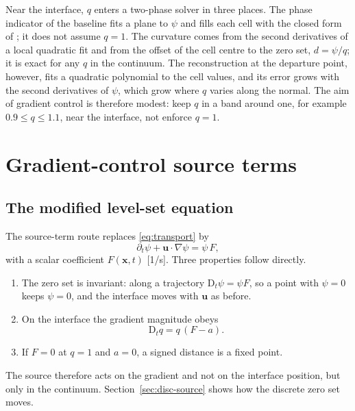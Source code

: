 \documentclass[preprint,3p,11pt]{elsarticle}
\newcommand{\psilev}{\psi}
\newcommand{\bu}{\mathbf{u}}
\newcommand{\bx}{\mathbf{x}}
\newcommand{\Dt}{\mathrm{D}_t}
\begin{document}
Near the interface, $q$ enters a two-phase solver in three places. The phase
indicator of the baseline fits a plane to $\psilev$ and fills each cell with the
closed form of \cite{DetrixheAslam2016}; it does not assume $q=1$. The curvature comes
from the second derivatives of a local quadratic fit and from the offset of the cell
centre to the zero set, $d=\psilev/q$; it is exact for any $q$ in the continuum. The
reconstruction at the departure point, however, fits a quadratic polynomial to the
cell values, and its error grows with the second derivatives of $\psilev$, which grow
where $q$ varies along the normal. The aim of gradient control is therefore modest:
keep $q$ in a band around one, for example $0.9\le q\le1.1$, near the interface, not
enforce $q=1$.

\section{Gradient-control source terms}
\label{sec:model}

\subsection{The modified level-set equation}
\label{sec:model-source}
The source-term route replaces \eqref{eq:transport} by
\begin{equation}
  \partial_t\psilev+\bu\cdot\nabla\psilev = \psilev\,F,
  \label{eq:sourceEq}
\end{equation}
with a scalar coefficient $F(\bx,t)$ [1/s]. Three properties follow directly.
\begin{enumerate}
  \item The zero set is invariant: along a trajectory $\Dt\psilev=\psilev F$, so a
  point with $\psilev=0$ keeps $\psilev=0$, and the interface moves with $\bu$ as
  before.
  \item On the interface the gradient magnitude obeys
  \begin{equation}
    \Dt q = q\,(F-a).
    \label{eq:designlaw}
  \end{equation}
  \item If $F=0$ at $q=1$ and $a=0$, a signed distance is a fixed point.
\end{enumerate}
The source therefore acts on the gradient and not on the interface position, but only
in the continuum. Section~\ref{sec:disc-source} shows how the discrete zero set moves.
\end{document}
